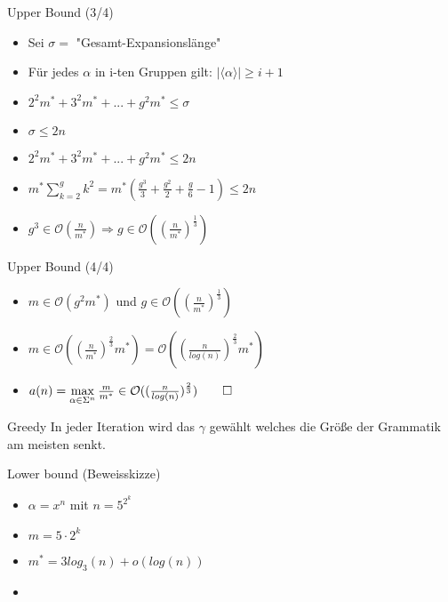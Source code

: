 \begin{frame}{\FrameName}
	\begin{block}{Upper Bound (3/4)}
    \begin{itemize}[<+->]
      \item Sei $\sigma = $ "Gesamt-Expansionslänge"
      \item Für jedes $\alpha$ in i-ten Gruppen gilt: $|\langle \alpha \rangle | \ge i+1$ 
      \item $2^2m^* + 3^2m^* + ... + g^2m^* \le \sigma$
      \item $\sigma \le 2n$
      \item $2^2m^* + 3^2m^* + ... + g^2m^* \le 2n$
      \item $m^* \sum_{k=2}^{g}k^2 = m^* (\frac{g^3}{3} + \frac{g^2}{2} + \frac{g}{6} - 1) \le 2n$
      \item $g^3 \in \mathcal{O}(\frac{n}{m^*}) \Rightarrow g \in \mathcal{O}((\frac{n}{m^*})^{\frac{1}{3}})$
    \end{itemize}
\end{block}
\end{frame}

\begin{frame}{\FrameName}
	\begin{block}{Upper Bound (4/4)}
    \begin{itemize}[<+->]
      \item $m\in \mathcal{O}(g^2 m^*)$ und $g \in \mathcal{O}((\frac{n}{m^*})^{\frac{1}{3}})$
      \item $m \in \mathcal{O}((\frac{n}{m^*})^{\frac{2}{3}} m^*) = \mathcal{O}((\frac{n}{log (n)})^{\frac{2}{3}} m^*)$
      \item $a(n) = \max\limits_{\alpha \in \Sigma^n} \frac{m}{m^*} \in \mathcal{O}((\frac{n}{log(n)})^{\frac{2}{3}}) \qed$
    \end{itemize}
\end{block}
\end{frame}

\begin{frame}{\FrameName}
	\begin{block}{Greedy}
    \Gap
    In jeder Iteration wird das $\gamma $ gewählt welches die Größe der Grammatik am meisten senkt.
\end{block}
\end{frame}

\begin{frame}{\FrameName}
	\begin{block}{Lower bound (Beweisskizze)}
    \begin{itemize}[<+->]
      \item $\alpha = x^n$ mit $n = 5^{2^k}$
      \item $m = 5 \cdot 2^k$
      \item $m^* = 3log_3(n) + o(log(n)) $
      \item {}
    \end{itemize}
\end{block}
\end{frame}
